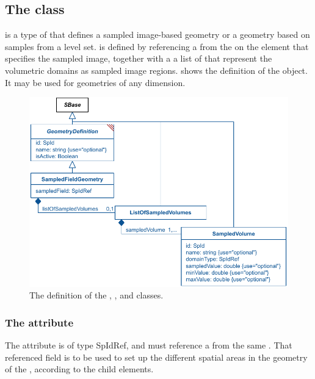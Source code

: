 \subsection{The  class}
\label{sampledfieldgeometry-class}
\label{listofsampledvolumes-class}
\SampledFieldGeometry is a type of \GeometryDefinition that defines a sampled image-based geometry or a geometry based on samples from a level set. \SampledFieldGeometry is defined by referencing a \SampledField from the \ListOfSampledFields on the \Geometry element that specifies the sampled image, together with a a list of \SampledVolumes that represent the volumetric domains as sampled image regions.  shows the definition of the \SampledFieldGeometry object.  It may be used for geometries of any dimension.

\begin{figure}[ht]
  \includegraphics{figs/SampledFieldGeometry-uml}
  \caption{The definition of the \SampledFieldGeometry, \ListOfSampledVolumes, and \SampledVolume classes.}
  \label{SampledFieldGeometry-uml}
  \label{ListOfSampledVolumes-uml}
  \label{SampledVolume-uml}
\end{figure}

\subsubsection{The \fixttspace{} attribute}
The  attribute is of type SpIdRef, and must reference a \SampledField from the same \Geometry.  That referenced field is to be used to set up the different spatial areas in the geometry of the \Model, according to the \SampledVolume child elements.

